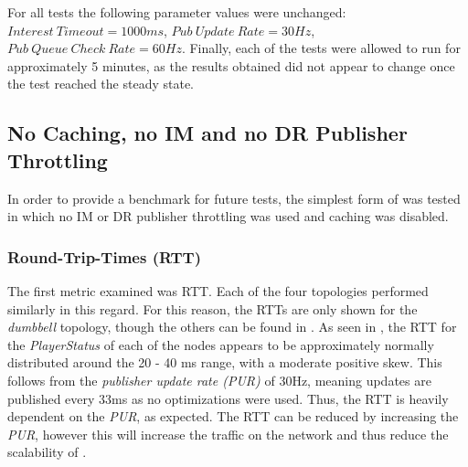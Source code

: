 
For all tests the following parameter values were unchanged: $Interest\ Timeout = 1000ms$, $Pub\ Update\ Rate = 30Hz$, $Pub\ Queue\ Check\ Rate = 60Hz$. Finally, each of the tests were allowed to run for approximately 5 minutes, as the results obtained did not appear to change once the test reached the steady state.

\subsection{No Caching, no IM and no DR Publisher Throttling}
In order to provide a benchmark for future tests, the simplest form of \game{} was tested in which no IM or DR publisher throttling was used and caching was disabled.

\subsubsection*{Round-Trip-Times (RTT)}
The first metric examined was RTT. Each of the four topologies performed similarly in this regard. For this reason, the RTTs are only shown for the \textit{dumbbell} topology, though the others can be found in . As seen in , the RTT for the \textit{PlayerStatus} of each of the nodes appears to be approximately normally distributed around the 20 - 40 ms range, with a moderate positive skew. This follows from the \textit{publisher update rate (PUR)} of 30Hz, meaning updates are published every 33ms as no optimizations were used. Thus, the RTT is heavily dependent on the \textit{PUR}, as expected. The RTT can be reduced by increasing the \textit{PUR}, however this will increase the traffic on the network and thus reduce the scalability of \game{}.  

